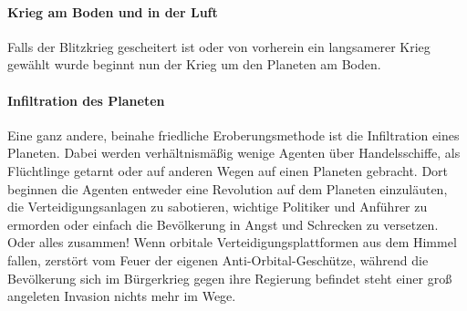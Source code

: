 \documentclass[11pt, a4paper]{article}
\begin{document}
\paragraph{Krieg am Boden und in der Luft}
Falls der Blitzkrieg gescheitert ist oder von vorherein ein langsamerer Krieg gewählt wurde beginnt nun der 
Krieg um den Planeten am Boden.
%
\paragraph{Infiltration des Planeten}
Eine ganz andere, beinahe friedliche Eroberungsmethode ist die Infiltration eines Planeten. Dabei werden 
verhältnismäßig wenige Agenten über Handelsschiffe, als Flüchtlinge getarnt oder auf anderen Wegen auf einen 
Planeten gebracht. Dort beginnen die Agenten entweder eine Revolution auf dem Planeten einzuläuten, die 
Verteidigungsanlagen zu sabotieren, wichtige Politiker und Anführer zu ermorden oder einfach die Bevölkerung 
in Angst und Schrecken zu versetzen. Oder alles zusammen! Wenn orbitale Verteidigungsplattformen aus dem 
Himmel fallen, zerstört vom Feuer der eigenen Anti-Orbital-Geschütze, während die Bevölkerung sich im 
Bürgerkrieg gegen ihre Regierung befindet steht einer groß angeleten Invasion nichts mehr im Wege. 
%
\end{document}
